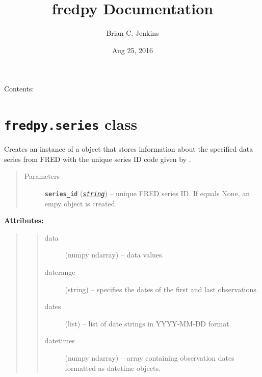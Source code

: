 \documentclass[letterpaper,10pt,english]{sphinxmanual}
\title{fredpy Documentation}
\date{Aug 25, 2016}
\author{Brian C. Jenkins}
\begin{document}
\maketitle
\tableofcontents
{}\label{index::doc}


Contents:


\chapter{\texttt{fredpy.series} class}
\label{series_class:welcome-to-fredpy-s-documentation}\label{series_class::doc}\label{series_class:fredpy-series-class}

\begin{fulllineitems}
\label{series_class:fredpy.series}
Creates an instance of a {\hyperref[series_class:fredpy.series]{}} object that stores information about the specified data series from FRED with the unique series ID code given by .
\begin{quote}\begin{description}
\item[{Parameters}] \leavevmode
\textbf{\texttt{series\_id}} (\href{https://docs.python.org/2/library/string.html\#module-string}{\emph{\texttt{string}}}) -- unique FRED series ID. If  equals None, an empy {\hyperref[series_class:fredpy.series]{}} object is created.

\end{description}\end{quote}

\textbf{Attributes:}
\begin{quote}
\begin{quote}\begin{description}
\item[{data}] \leavevmode
(numpy ndarray) --  data values.

\item[{daterange}] \leavevmode
(string) -- specifies the dates of the first and last observations.

\item[{dates}] \leavevmode
(list) -- list of date strings in YYYY-MM-DD format.

\item[{datetimes}] \leavevmode
(numpy ndarray) -- array containing observation dates formatted as datetime objects.


\end{description}
\end{quote}
\end{quote}
\end{fulllineitems}
\end{document}
